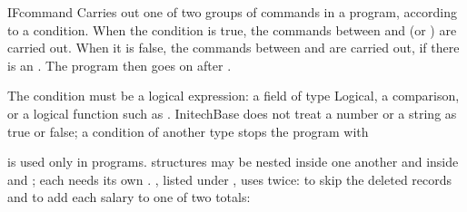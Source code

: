 \begin{XbaseEntry}{IF}{command}
%
Carries out one of two groups of commands in a program, according to a
condition.
\Syntax
{}
\Usage
When the condition is true, the commands between  and  (or
) are carried out.  When it is false, the commands between
 and  are carried out, if there is an .  The
program then goes on after .

The condition must be a logical expression: a field of type Logical, a
comparison, or a logical function such as .  InitechBase does not
treat a number or a string as true or false; a condition of another type stops
the program with 

 is used only in programs.   structures may be nested inside one
another and inside  and ; each  needs its own
.
\Examples
{}, listed under , uses  twice: to skip
the deleted records and to add each salary to one of two totals:
\end{XbaseEntry}

